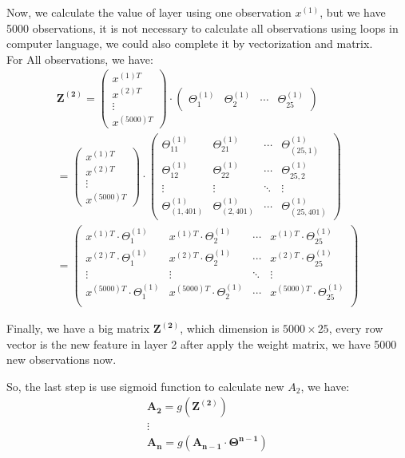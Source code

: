 \documentclass{article}
\begin{document}
Now, we calculate the value of layer using one observation $x^{(1)}$, but we have 5000 observations, it is not necessary to calculate all observations using loops in computer language, we could also complete it by vectorization and matrix.\\
For All observations, we have:
\begin{displaymath}
\begin{split}
  \mathbf{Z^{(2)}} = \begin{pmatrix}x^{(1)T}\\ x^{(2)T} \\ \vdots \\ x^{(5000)T}\end{pmatrix} \cdot
  \begin{pmatrix}
    \Theta^{(1)}_{1}&\Theta^{(1)}_{2}&\cdots&\Theta^{(1)}_{25}
  \end{pmatrix}\\
  =\begin{pmatrix}x^{(1)T}\\ x^{(2)T} \\ \vdots \\ x^{(5000)T}\end{pmatrix}\cdot
  \begin{pmatrix}
    \Theta^{(1)}_{11} & \Theta^{(1)}_{21} & \cdots &  \Theta^{(1)}_{(25,1)}\\
    \Theta^{(1)}_{12} & \Theta^{(1)}_{22} & \cdots &  \Theta^{(1)}_{25,2}\\
    \vdots & \vdots & \ddots & \vdots\\
    \Theta^{(1)}_{(1,401)} & \Theta^{(1)}_{(2,401)} & \cdots &  \Theta^{(1)}_{(25,401)}
  \end{pmatrix}
  \\=
  \begin{pmatrix}
    x^{(1)T}\cdot \Theta^{(1)}_{1} & x^{(1)T}\cdot \Theta^{(1)}_{2} & \cdots & x^{(1)T}\cdot \Theta^{(1)}_{25}\\
    x^{(2)T}\cdot \Theta^{(1)}_{1} & x^{(2)T}\cdot \Theta^{(1)}_{2} & \cdots & x^{(2)T}\cdot \Theta^{(1)}_{25}\\
    \vdots & \vdots & \ddots &\vdots\\
    x^{(5000)T}\cdot \Theta^{(1)}_{1} & x^{(5000)T}\cdot \Theta^{(1)}_{2} & \cdots & x^{(5000)T}\cdot \Theta^{(1)}_{25}\\
  \end{pmatrix}
\end{split}
\end{displaymath}

Finally, we have a big matrix $\mathbf{Z^{(2)}}$, which dimension is $5000 \times 25$, every row vector is the new feature in layer 2 after apply the weight matrix, we have 5000 new observations now.

So, the last step is use sigmoid function to calculate new $A_{2}$, we have:
\begin{displaymath}
\begin{split}
  \mathbf{A_{2}} = g(\mathbf{Z^{(2)}})\\
  \vdots\\
  \mathbf{A_{n}} = g(\mathbf{A_{n-1} \cdot \Theta^{n-1}})\\
\end{split}
\end{displaymath}
\end{document}
